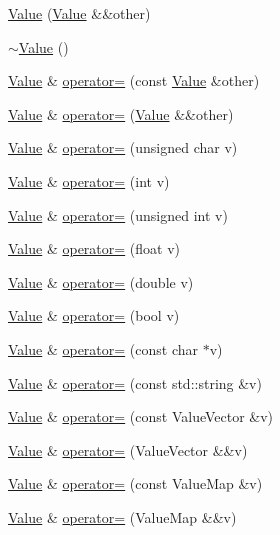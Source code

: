 \begin{DoxyCompactItemize}
\hyperlink{classValue_a787430959f5652852d4ea01daa512341}{Value} (\hyperlink{classValue}{Value} \&\&other)
\item 
\hyperlink{classValue_a3a578f458da8a4ab67052dba0f7bffdd}{$\sim$\+Value} ()
\item 
\hyperlink{classValue}{Value} \& \hyperlink{classValue_a72d1acd5e9d5711f776ba325a2f823b1}{operator=} (const \hyperlink{classValue}{Value} \&other)
\item 
\hyperlink{classValue}{Value} \& \hyperlink{classValue_ae51715910e94924915d8c5441ae69fb0}{operator=} (\hyperlink{classValue}{Value} \&\&other)
\item 
\hyperlink{classValue}{Value} \& \hyperlink{classValue_a94c5672ff663ae65bb94627188a9796b}{operator=} (unsigned char v)
\item 
\hyperlink{classValue}{Value} \& \hyperlink{classValue_ad335f85d7bbebb5b730b8745de9d7ed5}{operator=} (int v)
\item 
\hyperlink{classValue}{Value} \& \hyperlink{classValue_a25d05fbb6ebed1bde0eaccd65d3370ad}{operator=} (unsigned int v)
\item 
\hyperlink{classValue}{Value} \& \hyperlink{classValue_a876b27089d5d8813defe9a579ebe3a69}{operator=} (float v)
\item 
\hyperlink{classValue}{Value} \& \hyperlink{classValue_ad9936bf667613433c4788fc6bd8a3492}{operator=} (double v)
\item 
\hyperlink{classValue}{Value} \& \hyperlink{classValue_aafd206743bb929b271c7a597d9f18a21}{operator=} (bool v)
\item 
\hyperlink{classValue}{Value} \& \hyperlink{classValue_ab8021d9bd0a8ea249981189d58f95538}{operator=} (const char $\ast$v)
\item 
\hyperlink{classValue}{Value} \& \hyperlink{classValue_a83a78f29923e0d50b78d474c21018b37}{operator=} (const std\+::string \&v)
\item 
\hyperlink{classValue}{Value} \& \hyperlink{classValue_ab4516359f99b762381b1c88467570cf6}{operator=} (const Value\+Vector \&v)
\item 
\hyperlink{classValue}{Value} \& \hyperlink{classValue_a78e6c510e9652fc8adc0fd4f37b73cfd}{operator=} (Value\+Vector \&\&v)
\item 
\hyperlink{classValue}{Value} \& \hyperlink{classValue_abea3371009e837dc8d95a85d241aeecd}{operator=} (const Value\+Map \&v)
\item 
\hyperlink{classValue}{Value} \& \hyperlink{classValue_a33ee134f70ac6c58cd9fa56cabe49fa0}{operator=} (Value\+Map \&\&v)
\item 

\end{DoxyCompactItemize}

